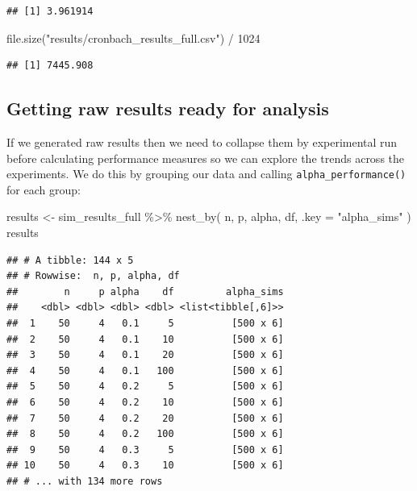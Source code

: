 \documentclass[
]{book}
\newenvironment{Shaded}{\begin{snugshade}}{\end{snugshade}}
\newcommand{\AttributeTok}[1]{\textcolor[rgb]{0.77,0.63,0.00}{#1}}
\newcommand{\DecValTok}[1]{\textcolor[rgb]{0.00,0.00,0.81}{#1}}
\newcommand{\FunctionTok}[1]{\textcolor[rgb]{0.00,0.00,0.00}{#1}}
\newcommand{\NormalTok}[1]{#1}
\newcommand{\OtherTok}[1]{\textcolor[rgb]{0.56,0.35,0.01}{#1}}
\newcommand{\SpecialCharTok}[1]{\textcolor[rgb]{0.00,0.00,0.00}{#1}}
\newcommand{\StringTok}[1]{\textcolor[rgb]{0.31,0.60,0.02}{#1}}
\begin{document}
\begin{verbatim}
## [1] 3.961914
\end{verbatim}

\begin{Shaded}
\begin{Highlighting}[]
\FunctionTok{file.size}\NormalTok{(}\StringTok{"results/cronbach\_results\_full.csv"}\NormalTok{) }\SpecialCharTok{/} \DecValTok{1024}
\end{Highlighting}
\end{Shaded}

\begin{verbatim}
## [1] 7445.908
\end{verbatim}

\hypertarget{getting-raw-results-ready-for-analysis}{%
\subsection{Getting raw results ready for analysis}\label{getting-raw-results-ready-for-analysis}}

If we generated raw results then we need to collapse them by experimental run
before calculating performance measures so we can explore the trends across the
experiments.
We do this by grouping our data and calling \texttt{alpha\_performance()} for each group:

\begin{Shaded}
\begin{Highlighting}[]
\NormalTok{results }\OtherTok{\textless{}{-}}\NormalTok{ sim\_results\_full }\SpecialCharTok{\%\textgreater{}\%}
  \FunctionTok{nest\_by}\NormalTok{( n, p, alpha, df, }\AttributeTok{.key =} \StringTok{"alpha\_sims"}\NormalTok{ )}
\NormalTok{results}
\end{Highlighting}
\end{Shaded}

\begin{verbatim}
## # A tibble: 144 x 5
## # Rowwise:  n, p, alpha, df
##        n     p alpha    df         alpha_sims
##    <dbl> <dbl> <dbl> <dbl> <list<tibble[,6]>>
##  1    50     4   0.1     5          [500 x 6]
##  2    50     4   0.1    10          [500 x 6]
##  3    50     4   0.1    20          [500 x 6]
##  4    50     4   0.1   100          [500 x 6]
##  5    50     4   0.2     5          [500 x 6]
##  6    50     4   0.2    10          [500 x 6]
##  7    50     4   0.2    20          [500 x 6]
##  8    50     4   0.2   100          [500 x 6]
##  9    50     4   0.3     5          [500 x 6]
## 10    50     4   0.3    10          [500 x 6]
## # ... with 134 more rows
\end{verbatim}
\end{document}
